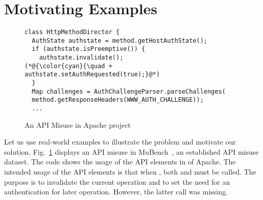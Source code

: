 \section{Motivating Examples}
\label{sec:motiv}

\begin{figure}[t]
	\centering
\begin{lstlisting}[]
class HttpMethodDirector {
  AuthState authstate = method.getHostAuthState();
  if (authstate.isPreemptive()) {
    authstate.invalidate();
(*@{\color{cyan}{\quad + authstate.setAuthRequested(true);}@*)
  }
  Map challenges = AuthChallengeParser.parseChallenges(
  method.getResponseHeaders(WWW_AUTH_CHALLENGE));
  ...
\end{lstlisting}
        \vspace{-12pt}
        \caption{An API Misuse in Apache  project}
        \vspace{-6pt}
        \label{fig:example1}
\end{figure}

Let us use real-world examples to illustrate the problem and motivate
our solution. Fig.~\ref{fig:example1} displays an API misuse in
MuBench~\cite{mudetect-msr19}, an established API misuse dataset. The
code shows the usage of the API elements in  of
Apache.  The intended usage of the API elements is that when
, both
 and
 must be called. The
purpose is to invalidate the current operation and to set the need for
an authentication for later operation. However, the latter call was
missing.

